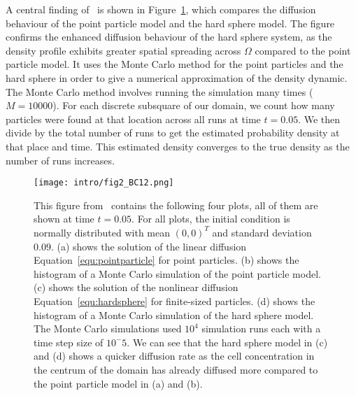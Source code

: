 A central finding of~\cite{Bruna2012} is shown in Figure~\ref{fig:fig2BC12}, which compares the diffusion behaviour of the point particle model and the hard sphere model. 
The figure confirms the enhanced diffusion behaviour of the hard sphere system, as the density profile exhibits greater spatial spreading across $\Omega$ compared to the point particle model.
It uses the Monte Carlo method for the point particles and the hard sphere in order to give a numerical approximation of the density dynamic. 
The Monte Carlo method involves running the simulation many times ($M=10000$). 
For each discrete subsquare of our domain, we count how many particles were found at that location across all runs at time $t=0.05$. 
We then divide by the total number of runs to get the estimated probability density at that place and time. 
This estimated density converges to the true density as the number of runs increases. \\

\begin{figure}[h!]
	\centering
    \texttt{[image: intro/fig2\_BC12.png]}
    \caption{
    This figure from~\cite{Bruna2012} contains the following four plots, all of them are shown at time \( t=0.05 \). 
	For all plots, the initial condition is normally distributed with mean $(0,0)^T$ and standard deviation $0.09$. 
    (a) shows the solution of the linear diffusion Equation~\eqref{equ:pointparticle} for point particles. 
    (b) shows the histogram of a Monte Carlo simulation of the point particle model. 
    (c) shows the solution of the nonlinear diffusion Equation~\eqref{equ:hardsphere} for finite-sized particles. 
    (d) shows the histogram of a Monte Carlo simulation of the hard sphere model. 
    The Monte Carlo simulations used $10^4$ simulation runs each with a time step size of $10^-5$.
	We can see that the hard sphere model in (c) and (d) shows a quicker diffusion rate as the cell concentration in the centrum of the domain has already diffused more compared to the point particle model in (a) and (b). 
    }
    \label{fig:fig2BC12}
\end{figure}



